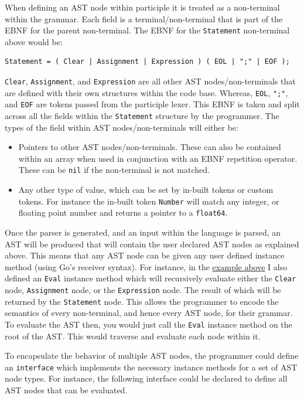 \documentclass[]{full}
\theoremstyle{definition}
\begin{document}
When defining an AST node within participle it is treated as a non-terminal within the grammar. Each field is a terminal/non-terminal that is part of the EBNF for the parent non-terminal. The EBNF for the \verb|Statement| non-terminal above would be:

\begin{verbatim}
Statement = ( Clear | Assignment | Expression ) ( EOL | ";" | EOF );
\end{verbatim}

\verb|Clear|, \verb|Assignment|, and \verb|Expression| are all other AST nodes/non-terminals that are defined with their own structures within the code base. Whereas, \verb|EOL|, \verb|";"|, and \verb|EOF| are tokens passed from the participle lexer. This EBNF is taken and split across all the fields within the \verb|Statement| structure by the programmer. The types of the field within AST nodes/non-terminals will either be:

\begin{itemize}
    \item Pointers to other AST nodes/non-terminals. These can also be contained within an array when used in conjunction with an EBNF repetition operator. These can be \verb|nil| if the non-terminal is not matched.
    \item Any other type of value, which can be set by in-built tokens or custom tokens. For instance the in-built token \verb|Number| will match any integer, or floating point number and returns a pointer to a \verb|float64|.
\end{itemize}

Once the parser is generated, and an input within the language is parsed, an AST will be produced that will contain the user declared AST nodes as explained above. This means that any AST node can be given any user defined instance method (using Go's receiver syntax). For instance, in the \hyperref[fig:four-func-calc-statement-ast-node]{example above} I also defined an \verb|Eval| instance method which will recursively evaluate either the \verb|Clear| node, \verb|Assignment| node, or the \verb|Expression| node. The result of which will be returned by the \verb|Statement| node. This allows the programmer to encode the semantics of every non-terminal, and hence every AST node, for their grammar. To evaluate the AST then, you would just call the \verb|Eval| instance method on the root of the AST. This would traverse and evaluate each node within it.

To encapsulate the behavior of multiple AST nodes, the programmer could define an \verb|interface| which implements the necessary instance methods for a set of AST node types. For instance, the following interface could be declared to define all AST nodes that can be evaluated.
\end{document}
